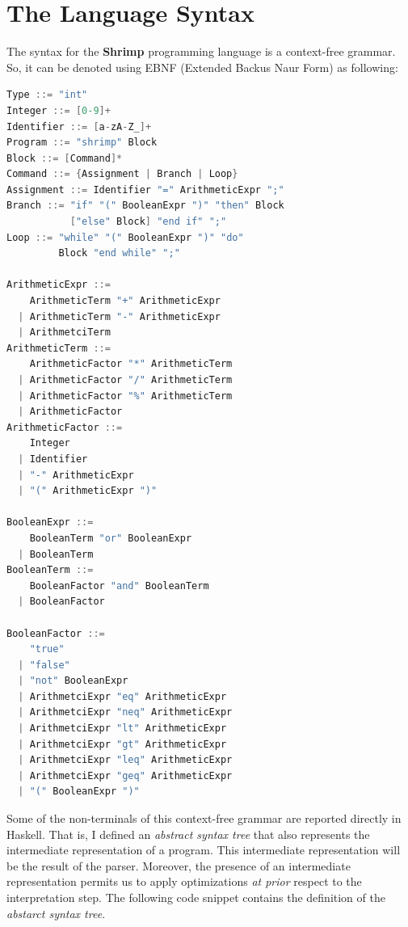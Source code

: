 \documentclass[12pt,a4paper]{article}
\begin{document}
\section*{The Language Syntax}
The syntax for the \textbf{Shrimp} programming language is a context-free grammar.
So, it can be denoted using EBNF (Extended Backus Naur Form) as following:
\begin{lstlisting}[language=C, style=custom-style]
Type ::= "int"
Integer ::= [0-9]+
Identifier ::= [a-zA-Z_]+
Program ::= "shrimp" Block
Block ::= [Command]*
Command ::= {Assignment | Branch | Loop}
Assignment ::= Identifier "=" ArithmeticExpr ";"
Branch ::= "if" "(" BooleanExpr ")" "then" Block
           ["else" Block] "end if" ";"
Loop ::= "while" "(" BooleanExpr ")" "do"
         Block "end while" ";"

ArithmeticExpr ::=
    ArithmeticTerm "+" ArithmeticExpr
  | ArithmeticTerm "-" ArithmeticExpr
  | ArithmetciTerm
ArithmeticTerm ::=
    ArithmeticFactor "*" ArithmeticTerm
  | ArithmeticFactor "/" ArithmeticTerm
  | ArithmeticFactor "%" ArithmeticTerm
  | ArithmeticFactor
ArithmeticFactor ::=
    Integer
  | Identifier
  | "-" ArithmeticExpr
  | "(" ArithmeticExpr ")"

BooleanExpr ::=
    BooleanTerm "or" BooleanExpr
  | BooleanTerm
BooleanTerm ::=
    BooleanFactor "and" BooleanTerm
  | BooleanFactor

BooleanFactor ::=
    "true"
  | "false"
  | "not" BooleanExpr
  | ArithmetciExpr "eq" ArithmeticExpr
  | ArithmetciExpr "neq" ArithmeticExpr
  | ArithmetciExpr "lt" ArithmeticExpr
  | ArithmetciExpr "gt" ArithmeticExpr
  | ArithmetciExpr "leq" ArithmeticExpr
  | ArithmetciExpr "geq" ArithmeticExpr
  | "(" BooleanExpr ")"
\end{lstlisting}
Some of the non-terminals of this context-free grammar are reported directly in Haskell.
That is, I defined an \textit{abstract syntax tree} that also represents the intermediate representation of a program.
This intermediate representation will be the result of the parser.
Moreover, the presence of an intermediate representation permits us to apply optimizations \textit{at prior} respect to the interpretation step.
The following code snippet contains the definition of the \textit{abstarct syntax tree}.
\end{document}

